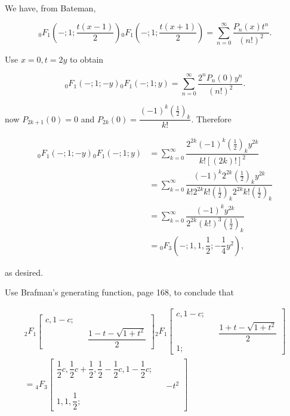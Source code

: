 \begin{solution}
We have, from Bateman,

$${}_0F_1 \left(-;1; \dfrac{t(x-1)}{2} \right) {}_0F_1 \left(-;1;\dfrac{t(x+1)}{2} \right) = \displaystyle\sum_{n=0}^{\infty} \dfrac{P_n(x)t^n}{(n!)^2}.$$

Use $x=0, t=2y$ to obtain

$${}_0F_1(-;1;-y) {}_0F_1(-;1;y) = \displaystyle\sum_{n=0}^{\infty} \dfrac{2^n P_n(0) y^n}{(n!)^2}.$$

now $P_{2k+1}(0)=0$ and $P_{2k}(0) = \dfrac{(-1)^k (\frac{1}{2})_k}{k!}.$ Therefore

$$\begin{array}{ll}
{}_0F_1(-;1;-y) {}_0F_1(-;1;y) &= \displaystyle\sum_{k=0}^{\infty} \dfrac{2^{2k} (-1)^k (\frac{1}{2})_k y^{2k}}{k! [(2k)!]^2} \\
&= \displaystyle\sum_{k=0}^{\infty} \dfrac{(-1)^k 2^{2k} (\frac{1}{2})_k y^{2k}}{k! 2^{2k} k! (\frac{1}{2})_k 2^{2k} k! (\frac{1}{2})_k} \\
&= \displaystyle\sum_{k=0}^{\infty} \dfrac{(-1)^k y^{2k}}{2^{2k} (k!)^3 (\frac{1}{2})_k} \\
&= {}_0F_3 \left(-;1,1,\dfrac{1}{2}; - \dfrac{1}{4} y^2 \right),
\end{array}$$

as desired.
\end{solution}
\begin{problem}\label{problem6chapter10}
Use Brafman's generating function, page 168, to conclude that

$$\begin{array}{ll}
{}_2F_1 \left[ \begin{array}{rlr}
c, 1-c; & & \\
& & \dfrac{1-t-\sqrt{1+t^2}}{2}
\end{array} \right] {}_2F_1 \left[ \begin{array}{rlr}
c, 1-c; & & \\
& & \dfrac{1+t-\sqrt{1+t^2}}{2} \\
1; & & 
\end{array} \right] \\
={}_4F_3 \left[ \begin{array}{rlr}
\dfrac{1}{2}c, \dfrac{1}{2}c+\dfrac{1}{2}, \dfrac{1}{2} - \dfrac{1}{2}c, 1 - \dfrac{1}{2}c; & & \\
& & -t^2 \\
1, 1, \dfrac{1}{2}; & & 
\end{array} \right]
\end{array}$$
\end{problem}
